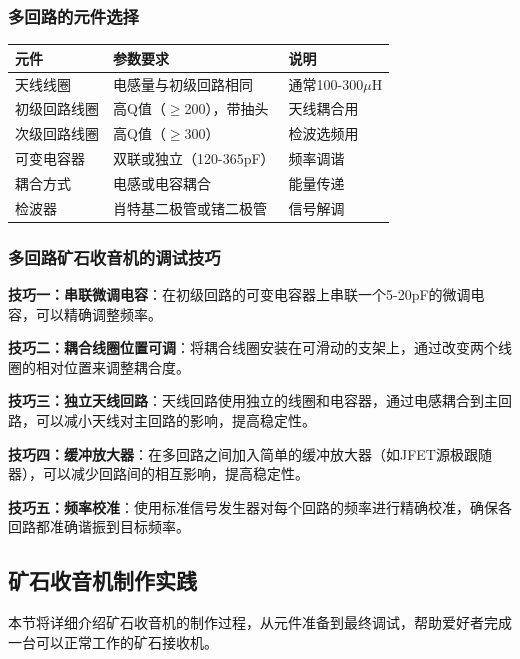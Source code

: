 \subsubsection{多回路的元件选择}
\label{sec:multi_loop_components}

\begin{center}
\begin{tabular}{|p{3cm}|p{4cm}|p{4cm}|}
\hline
\textbf{元件} & \textbf{参数要求} & \textbf{说明} \\
\hline
天线线圈 & 电感量与初级回路相同 & 通常100-300$\mu$H \\
初级回路线圈 & 高Q值（$\geq$200），带抽头 & 天线耦合用 \\
次级回路线圈 & 高Q值（$\geq$300） & 检波选频用 \\
可变电容器 & 双联或独立（120-365pF） & 频率调谐 \\
耦合方式 & 电感或电容耦合 & 能量传递 \\
检波器 & 肖特基二极管或锗二极管 & 信号解调 \\
\hline
\end{tabular}
\end{center}

\subsubsection{多回路矿石收音机的调试技巧}
\label{sec:multi_loop_tips}

\textbf{技巧一：串联微调电容}：在初级回路的可变电容器上串联一个5-20pF的微调电容，可以精确调整频率。

\textbf{技巧二：耦合线圈位置可调}：将耦合线圈安装在可滑动的支架上，通过改变两个线圈的相对位置来调整耦合度。

\textbf{技巧三：独立天线回路}：天线回路使用独立的线圈和电容器，通过电感耦合到主回路，可以减小天线对主回路的影响，提高稳定性。

\textbf{技巧四：缓冲放大器}：在多回路之间加入简单的缓冲放大器（如JFET源极跟随器），可以减少回路间的相互影响，提高稳定性。

\textbf{技巧五：频率校准}：使用标准信号发生器对每个回路的频率进行精确校准，确保各回路都准确谐振到目标频率。

\subsection{矿石收音机制作实践}
\label{sec:crystal_radio_practice}

本节将详细介绍矿石收音机的制作过程，从元件准备到最终调试，帮助爱好者完成一台可以正常工作的矿石接收机。


